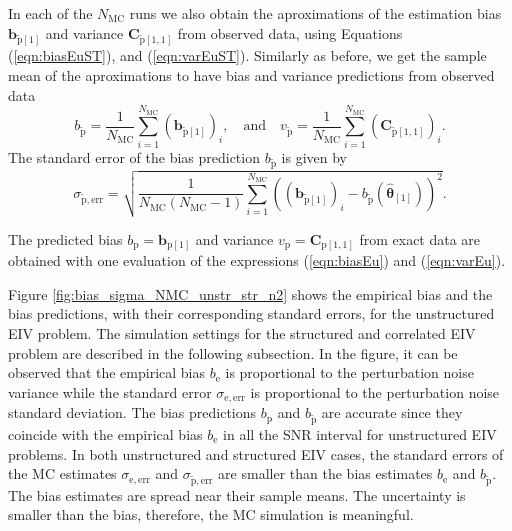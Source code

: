 In each of the $N_{\mathrm{MC}}$ runs we also obtain the aproximations of the estimation bias $\mathbf{b}_{\widetilde{\mathrm{p}} \left[1\right]}$ and variance $\mathbf{C}_{\widetilde{\mathrm{p}} \left[1,1\right]}$  from observed data, using Equations (\ref{eqn:biasEuST}), and (\ref{eqn:varEuST}).
Similarly as before, we get the sample mean of the aproximations to have bias and variance predictions from observed data 
 \begin{equation} b_{\widetilde{\mathrm{p}}} = \frac{1}{N_{\mathrm{MC}}} \sum_{i=1}^{N_{\mathrm{MC}}}{ \left( \mathbf{b}_{\widetilde{\mathrm{p}} \left[1\right]} \right)_i } , \quad \mathrm{and} 
 \quad v_{\widetilde{\mathrm{p}}}  = \frac{1}{N_{\mathrm{MC}}} \sum_{i=1}^{N_{\mathrm{MC}}}{ \left( \mathbf{C}_{\widetilde{\mathrm{p}} \left[1,1\right]} \right)_i } . \end{equation} 
The standard error of the bias prediction $b_{\widetilde{\mathrm{p}}}$ is given by
\begin{equation} \sigma_{\widetilde{\mathrm{p}}, \mathrm{err}} = \sqrt{ \frac{1}{N_{\mathrm{MC}} \left( N_{\mathrm{MC}}-1 \right)} \sum_{i=1}^{N_{\mathrm{MC}}} { \left( \left( \mathbf{b}_{\widetilde{\mathrm{p}} \left[1\right]} \right)_i - b_{\widetilde{\mathrm{p}}} \left( \widehat{\bm{\theta}}_{\left[1\right]} \right) \right)^2 } } . \end{equation}

The predicted bias $b_{\mathrm{p}} = \mathbf{b}_{\mathrm{p} \left[1\right]}$ and variance $v_{\mathrm{p}} = \mathbf{C}_{\mathrm{p} \left[1,1\right]}$ from exact data are obtained with one evaluation of the expressions (\ref{eqn:biasEu}) and (\ref{eqn:varEu}). %

Figure \ref{fig:bias_sigma_NMC_unstr_str_n2} shows the empirical bias and the bias predictions, with their corresponding standard errors, \color{blue} for the unstructured EIV problem\color{black}.
The simulation settings for the structured and correlated EIV problem are described in the following subsection.
In the figure, it can be observed that the empirical bias $b_\mathrm{e}$ is proportional to the perturbation noise variance while the standard error $\sigma_\mathrm{e, err}$ is proportional to the perturbation noise standard deviation.
The bias predictions $b_\mathrm{p}$ and $b_{\widetilde{\mathrm{p}}}$ are accurate since they coincide with the empirical bias $b_\mathrm{e}$ in all the SNR interval for unstructured EIV problems. 
In both unstructured and structured EIV cases, the standard errors of the MC estimates $\sigma_{\mathrm{e, err}}$ and $\sigma_{\widetilde{\mathrm{p}}, \mathrm{err}}$ are smaller than the bias estimates $b_{\mathrm{e}}$ and $b_{\widetilde{\mathrm{p}}}$.
The bias estimates are spread near their sample means. 
The uncertainty is smaller than the bias, therefore, the MC simulation is meaningful.

